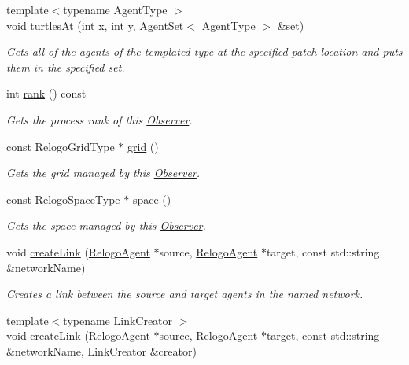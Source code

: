 \begin{DoxyCompactItemize}
{\footnotesize template$<$typename Agent\-Type $>$ }\\void \hyperlink{classrepast_1_1relogo_1_1_observer_aa35e9afb1ecc83b3bb5c2b62c1059cdc}{turtles\-At} (int x, int y, \hyperlink{classrepast_1_1relogo_1_1_agent_set}{Agent\-Set}$<$ Agent\-Type $>$ \&set)
\begin{DoxyCompactList}\small\item\em Gets all of the agents of the templated type at the specified patch location and puts them in the specified set. \end{DoxyCompactList}\item 
int \hyperlink{classrepast_1_1relogo_1_1_observer_aca1427918732c400436240998ba1739f}{rank} () const 
\begin{DoxyCompactList}\small\item\em Gets the process rank of this \hyperlink{classrepast_1_1relogo_1_1_observer}{Observer}. \end{DoxyCompactList}\item 
const Relogo\-Grid\-Type $\ast$ \hyperlink{classrepast_1_1relogo_1_1_observer_a11b3edc4275730a56775fc8f275b47c7}{grid} ()
\begin{DoxyCompactList}\small\item\em Gets the grid managed by this \hyperlink{classrepast_1_1relogo_1_1_observer}{Observer}. \end{DoxyCompactList}\item 
const Relogo\-Space\-Type $\ast$ \hyperlink{classrepast_1_1relogo_1_1_observer_aea3636a7f63319553eee9e0b09d2523c}{space} ()
\begin{DoxyCompactList}\small\item\em Gets the space managed by this \hyperlink{classrepast_1_1relogo_1_1_observer}{Observer}. \end{DoxyCompactList}\item 
void \hyperlink{classrepast_1_1relogo_1_1_observer_aa6a58226752ace6c89cff6cdd546806b}{create\-Link} (\hyperlink{classrepast_1_1relogo_1_1_relogo_agent}{Relogo\-Agent} $\ast$source, \hyperlink{classrepast_1_1relogo_1_1_relogo_agent}{Relogo\-Agent} $\ast$target, const std\-::string \&network\-Name)
\begin{DoxyCompactList}\small\item\em Creates a link between the source and target agents in the named network. \end{DoxyCompactList}\item 
{\footnotesize template$<$typename Link\-Creator $>$ }\\void \hyperlink{classrepast_1_1relogo_1_1_observer_a82c935b25859fb94e8010e25ee880854}{create\-Link} (\hyperlink{classrepast_1_1relogo_1_1_relogo_agent}{Relogo\-Agent} $\ast$source, \hyperlink{classrepast_1_1relogo_1_1_relogo_agent}{Relogo\-Agent} $\ast$target, const std\-::string \&network\-Name, Link\-Creator \&creator)

\end{DoxyCompactItemize}
